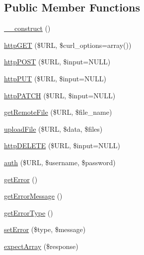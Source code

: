 \subsection*{Public Member Functions}
\begin{DoxyCompactItemize}
\item 
\hyperlink{classGalaxyHTTPRequest_acfb5537e004575571ac98724acb98aa1}{\-\_\-\-\_\-construct} ()
\item 
\hyperlink{classGalaxyHTTPRequest_aa158a65aa16bce21704f96f0a1b26a6b}{http\-G\-E\-T} (\$U\-R\-L, \$curl\-\_\-options=array())
\item 
\hyperlink{classGalaxyHTTPRequest_a3baf3c23d62fc0f7fd51198129a92819}{http\-P\-O\-S\-T} (\$U\-R\-L, \$input=N\-U\-L\-L)
\item 
\hyperlink{classGalaxyHTTPRequest_a54f7ae8f69da344ad0683657eba7b90e}{http\-P\-U\-T} (\$U\-R\-L, \$input=N\-U\-L\-L)
\item 
\hyperlink{classGalaxyHTTPRequest_a884e1813a5b594aa052ee9d44b4e9127}{http\-P\-A\-T\-C\-H} (\$U\-R\-L, \$input=N\-U\-L\-L)
\item 
\hyperlink{classGalaxyHTTPRequest_a522c94d27f40e84e11bf0020753d9d67}{get\-Remote\-File} (\$U\-R\-L, \$file\-\_\-name)
\item 
\hyperlink{classGalaxyHTTPRequest_a1b0ac0853de2c399956b6a64bb82b5ad}{upload\-File} (\$U\-R\-L, \$data, \$files)
\item 
\hyperlink{classGalaxyHTTPRequest_ac56712bb4a3c5437dbc581cba699198b}{http\-D\-E\-L\-E\-T\-E} (\$U\-R\-L, \$input=N\-U\-L\-L)
\item 
\hyperlink{classGalaxyHTTPRequest_a9e802c258f537b505aa18a3aec1315ba}{auth} (\$U\-R\-L, \$username, \$password)
\item 
\hyperlink{classGalaxyHTTPRequest_a72f394afb282f6e578ed12fd26a3d22f}{get\-Error} ()
\item 
\hyperlink{classGalaxyHTTPRequest_ac66ae869af44fe97917c6301329b23d4}{get\-Error\-Message} ()
\item 
\hyperlink{classGalaxyHTTPRequest_afb2ca4429dcaaa34246755ebdedcd7e7}{get\-Error\-Type} ()
\item 
\hyperlink{classGalaxyHTTPRequest_aa292af44a7986f5320510db8b2af3ae3}{set\-Error} (\$type, \$message)
\item 
\hyperlink{classGalaxyHTTPRequest_aed346abf2949176de07ee0db1a8de506}{expect\-Array} (\$response)
\end{DoxyCompactItemize}


